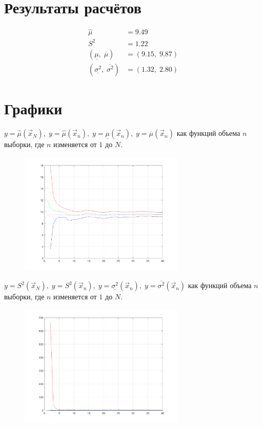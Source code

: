 
\section{Результаты расчётов}

\begin{align*}
    \hat{\mu} &= 9.49\\
    S^{2} &= 1.22\\
    (\underline{\mu},\;\overline{\mu}) &= (9.15,\;9.87)\\
    (\underline{\sigma^{2}},\;\overline{\sigma^{2}}) &= (1.32,\;2.80)
\end{align*}


\section{Графики}

$y=\hat{\mu}(\vec{x}_{N}),\; y=\hat{\mu}(\vec{x}_{n}),\; y=\underline{\mu}(\vec{x}_{n}),\; y=\overline{\mu}(\vec{x}_{n})$ как функций объема $n$ выборки, где  $n$ изменяется от $1$ до $N$.

\begin{figure}[h]
    \centering
    \includegraphics[width=0.7\textwidth]{../graphics/1.png}
\end{figure}



\newpage

$y=S^{2}(\vec{x}_{N}),\; y=S^{2}(\vec{x}_{n}),\; y=\underline{\sigma^{2}}(\vec{x}_{n}),\; y=\overline{\sigma^{2}}(\vec{x}_{n})$ как функций объема $n$ выборки, где $n$ изменяется от $1$ до $N$.

\begin{figure}[h]
    \centering
    \includegraphics[width=0.7\textwidth]{../graphics/2.png}
\end{figure}